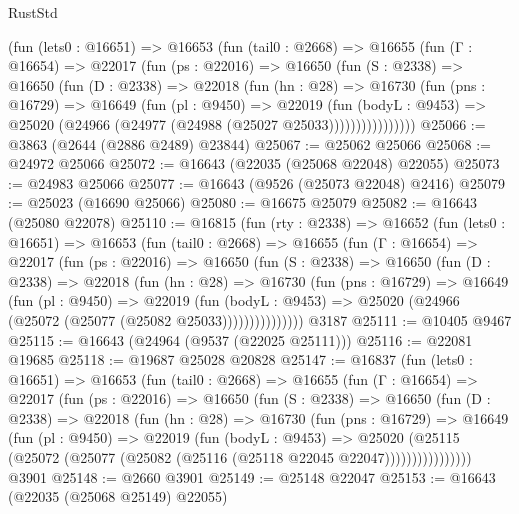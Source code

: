 \begin{lexlean}{RustStd}
\begin{coremodule}
        (fun (lets0 : @16651) =>
        @16653
          (fun (tail0 : @2668) =>
          @16655
            (fun (Γ : @16654) =>
            @22017
              (fun (ps : @22016) =>
              @16650
                (fun (S : @2338) =>
                @16650
                  (fun (D : @2338) =>
                  @22018
                    (fun (hn : @28) =>
                    @16730
                      (fun (pns : @16729) =>
                      @16649
                        (fun (pl : @9450) =>
                        @22019
                          (fun (bodyL : @9453) =>
                          @25020 (@24966 (@24977 (@24988 (@25027 @25033))))))))))))))))
@25066 := @3863 (@2644 (@2886 @2489) @23844)
@25067 := @25062 @25066
@25068 := @24972 @25066
@25072 := @16643 (@22035 (@25068 @22048) @22055)
@25073 := @24983 @25066
@25077 := @16643 (@9526 (@25073 @22048) @2416)
@25079 := @25023 (@16690 @25066)
@25080 := @16675 @25079
@25082 := @16643 (@25080 @22078)
@25110 := @16815
    (fun (rty : @2338) =>
    @16652
      (fun (lets0 : @16651) =>
      @16653
        (fun (tail0 : @2668) =>
        @16655
          (fun (Γ : @16654) =>
          @22017
            (fun (ps : @22016) =>
            @16650
              (fun (S : @2338) =>
              @16650
                (fun (D : @2338) =>
                @22018
                  (fun (hn : @28) =>
                  @16730
                    (fun (pns : @16729) =>
                    @16649
                      (fun (pl : @9450) =>
                      @22019
                        (fun (bodyL : @9453) =>
                        @25020 (@24966 (@25072 (@25077 (@25082 @25033)))))))))))))))
    @3187
@25111 := @10405 @9467
@25115 := @16643 (@24964 (@9537 (@22025 @25111)))
@25116 := @22081 @19685
@25118 := @19687 @25028 @20828
@25147 := @16837
    (fun (lets0 : @16651) =>
    @16653
      (fun (tail0 : @2668) =>
      @16655
        (fun (Γ : @16654) =>
        @22017
          (fun (ps : @22016) =>
          @16650
            (fun (S : @2338) =>
            @16650
              (fun (D : @2338) =>
              @22018
                (fun (hn : @28) =>
                @16730
                  (fun (pns : @16729) =>
                  @16649
                    (fun (pl : @9450) =>
                    @22019
                      (fun (bodyL : @9453) =>
                      @25020
                        (@25115
                          (@25072 (@25077 (@25082 (@25116 (@25118 @22045 @22047))))))))))))))))
    @3901
@25148 := @2660 @3901
@25149 := @25148 @22047
@25153 := @16643 (@22035 (@25068 @25149) @22055)

\end{coremodule}
\end{lexlean}

